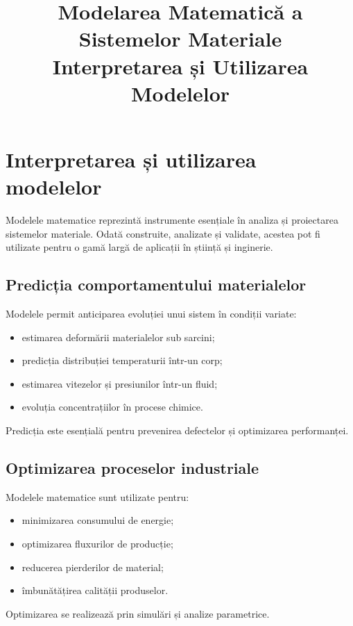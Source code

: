 \documentclass[12pt,a4paper]{article}
\title{Modelarea Matematică a Sistemelor Materiale \\ \large Interpretarea și Utilizarea Modelelor}
\author{}
\date{}
\begin{document}
\maketitle

\section{Interpretarea și utilizarea modelelor}

Modelele matematice reprezintă instrumente esențiale în analiza și proiectarea sistemelor materiale. Odată construite, analizate și validate, acestea pot fi utilizate pentru o gamă largă de aplicații în știință și inginerie.

\subsection*{Predicția comportamentului materialelor}

Modelele permit anticiparea evoluției unui sistem în condiții variate:
\begin{itemize}
    \item estimarea deformării materialelor sub sarcini;
    \item predicția distribuției temperaturii într-un corp;
    \item estimarea vitezelor și presiunilor într-un fluid;
    \item evoluția concentrațiilor în procese chimice.
\end{itemize}

Predicția este esențială pentru prevenirea defectelor și optimizarea performanței.

\subsection*{Optimizarea proceselor industriale}

Modelele matematice sunt utilizate pentru:
\begin{itemize}
    \item minimizarea consumului de energie;
    \item optimizarea fluxurilor de producție;
    \item reducerea pierderilor de material;
    \item îmbunătățirea calității produselor.
\end{itemize}

Optimizarea se realizează prin simulări și analize parametrice.
\end{document}
